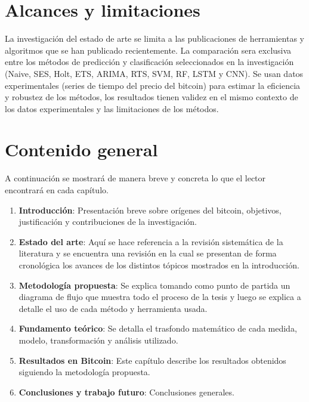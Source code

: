 \section{Alcances y limitaciones}
La investigación del estado de arte se limita a las publicaciones de herramientas y algoritmos que se han publicado recientemente. La comparación sera exclusiva entre los métodos de predicción y clasificación seleccionados en la investigación (Naive, SES, Holt, ETS, ARIMA, RTS, SVM, RF, LSTM y CNN). Se usan datos experimentales (series de tiempo del precio del bitcoin) para estimar la eficiencia y robustez de los métodos, los resultados tienen validez en el mismo contexto de los datos experimentales y las limitaciones de los métodos.
\vspace{-0.5cm}
\section{Contenido general}
A continuación se mostrará de manera breve y concreta lo que el lector encontrará en cada capítulo.

\begin{enumerate}
	\item \textbf{Introducción}: Presentación breve sobre orígenes del bitcoin, objetivos, justificación y contribuciones de la investigación.
	
	\item \textbf{Estado del arte}: Aquí se hace referencia a la revisión sistemática de la literatura y se encuentra una revisión en la cual se presentan de forma cronológica los avances de los distintos tópicos mostrados en la introducción. 
	
	\item \textbf{Metodología propuesta}: Se explica tomando como punto de partida un diagrama de flujo que muestra todo el proceso de la tesis y luego se explica a detalle el uso de cada método y herramienta usada.
	
	\item \textbf{Fundamento teórico}: Se detalla el trasfondo matemático de cada medida, modelo, transformación y análisis utilizado.
	
	\item \textbf{Resultados en Bitcoin}: Este capítulo describe los resultados obtenidos siguiendo la metodología propuesta.
	
	\item \textbf{Conclusiones y trabajo futuro}: Conclusiones generales.
\end{enumerate}


